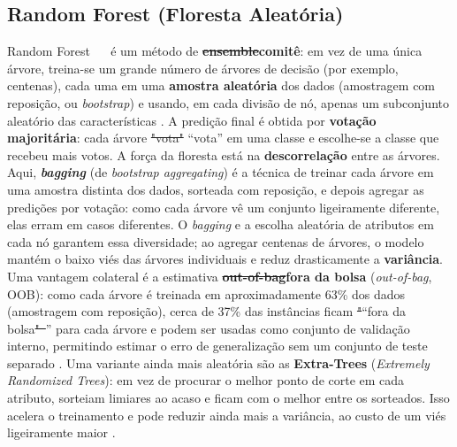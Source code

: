 \documentclass[msc]{on} %
\makeatletter
\providecommand{\DIFaddtex}[1]{{\protect\color{red}#1}} %
\providecommand{\DIFdeltex}[1]{{\protect\color{red}\sout{#1}}} %
\providecommand{\DIFaddbegin}{} %
\providecommand{\DIFaddend}{} %
\providecommand{\DIFdelbegin}{} %
\providecommand{\DIFdelend}{} %
\providecommand{\DIFadd}[1]{\texorpdfstring{\DIFaddtex{#1}}{#1}} %
\providecommand{\DIFdel}[1]{\texorpdfstring{\DIFdeltex{#1}}{}} %
\let\sout@orig\sout %
\renewcommand{\sout}[1]{\ifmmode\text{\sout@orig{\ensuremath{#1}}}\else\sout@orig{#1}\fi} %
\makeatother
\begin{document}
\subsection{Random Forest (Floresta Aleatória)}

Random Forest \DIFaddbegin \DIFadd{\mbox{%
\citep{Breiman2001} }\hskip0pt%
}\DIFaddend é um método de \textbf{\DIFdelbegin \DIFdel{ensemble}\DIFdelend\ifhmode\hskip0pt\fi \DIFaddbegin \DIFadd{comitê}\DIFaddend }: em vez de uma única árvore, treina-se um grande número de árvores de decisão (por exemplo, centenas), cada uma em uma \textbf{amostra aleatória} dos dados (amostragem com reposição, ou \textit{bootstrap}) e usando, em cada divisão de nó, apenas um subconjunto aleatório das características \citep{geron2019maos, Levada2026}. A predição final é obtida por \textbf{votação majoritária}: cada árvore \DIFdelbegin \DIFdel{"vota" }\DIFdelend\ifhmode\hskip0pt\fi \DIFaddbegin \DIFadd{``vota'' }\DIFaddend em uma classe e escolhe-se a classe que recebeu mais votos. A força da floresta está na \textbf{descorrelação} entre as árvores. Aqui, \textbf{\textit{bagging}} (de \textit{bootstrap aggregating}) é a técnica de treinar cada árvore em uma amostra distinta dos dados, sorteada com reposição, e depois agregar as predições por votação: como cada árvore vê um conjunto ligeiramente diferente, elas erram em casos diferentes. O \textit{bagging} e a escolha aleatória de atributos em cada nó garantem essa diversidade; ao agregar centenas de árvores, o modelo mantém o baixo viés das árvores individuais e reduz drasticamente a \textbf{variância}. Uma vantagem colateral é a estimativa \textbf{\DIFdelbegin \DIFdel{out-of-bag}\DIFdelend\ifhmode\hskip0pt\fi \DIFaddbegin \DIFadd{fora da bolsa}\DIFaddend } (\DIFaddbegin \textit{\DIFadd{out-of-bag}}\DIFadd{, }\DIFaddend OOB): como cada árvore é treinada em aproximadamente 63\% dos dados (amostragem com reposição), cerca de 37\% das instâncias ficam \DIFdelbegin \DIFdel{"}\DIFdelend\ifhmode\hskip0pt\fi \DIFaddbegin \DIFadd{``}\DIFaddend fora da bolsa\DIFdelbegin \DIFdel{"~}\DIFdelend\ifhmode\hskip0pt\fi \DIFaddbegin \DIFadd{'' }\DIFaddend para cada árvore e podem ser usadas como conjunto de validação interno, permitindo estimar o erro de generalização sem um conjunto de teste separado \citep{geron2019maos}. Uma variante ainda mais aleatória são as \textbf{Extra-Trees} (\textit{Extremely Randomized Trees}): em vez de procurar o melhor ponto de corte em cada atributo, sorteiam limiares ao acaso e ficam com o melhor entre os sorteados. Isso acelera o treinamento e pode reduzir ainda mais a variância, ao custo de um viés ligeiramente maior \citep{geron2019maos}.
\end{document}
